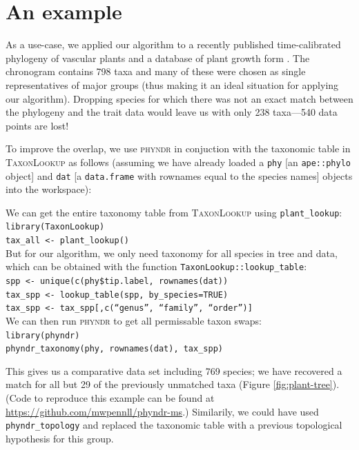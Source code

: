 \documentclass[a4paper,11pt]{article}
\begin{document}
\section{An example}

As a use-case, we applied our algorithm to a recently published time-calibrated phylogeny of vascular plants \citep{Magallon2015} and a database of plant growth form \citep{Zanne}. The \citet{Magallon2015} chronogram contains 798 taxa and many of these were chosen as single representatives of major groups (thus making it an ideal situation for applying our algorithm). Dropping species for which there was not an exact match between the phylogeny and the trait data would leave us with only 238 taxa---540 data points are lost!

To improve the overlap, we use \textsc{phyndr} in conjuction with the taxonomic table in \textsc{TaxonLookup} as follows (assuming we have already loaded a \texttt{phy} [an \texttt{ape::phylo} object] and \texttt{dat} [a \texttt{data.frame} with rownames equal to the species names] objects into the workspace):
\begin{flushleft}
We can get the entire taxonomy table from \textsc{TaxonLookup} using \texttt{plant\_lookup}:\\
\texttt{library(TaxonLookup)}\\
\texttt{tax\_all <- plant\_lookup()}\\
\bigskip
But for our algorithm, we only need taxonomy for all species in tree and data, which can be obtained with the function \texttt{TaxonLookup::lookup\_table}:\\
\texttt{spp <- unique(c(phy\$tip.label, rownames(dat))}\\
\texttt{tax\_spp <- lookup\_table(spp, by\_species=TRUE)}\\
\texttt{tax\_spp <- tax\_spp[,c(``genus'', ``family'', ``order'')]}\\
\bigskip
We can then run \textsc{phyndr} to get all permissable taxon swaps:\\
\texttt{library(phyndr)}\\
\texttt{phyndr\_taxonomy(phy, rownames(dat), tax\_spp)}\\

\end{flushleft}
This gives us a comparative data set including 769 species; we have recovered a match for all but 29 of the previously unmatched taxa (Figure \ref{fig:plant-tree}). (Code to reproduce this example can be found at \url{https://github.com/mwpennll/phyndr-ms}.) Similarily, we could have used \texttt{phyndr\_topology} and replaced the taxonomic table with a previous topological hypothesis for this group.
 
\end{document}
